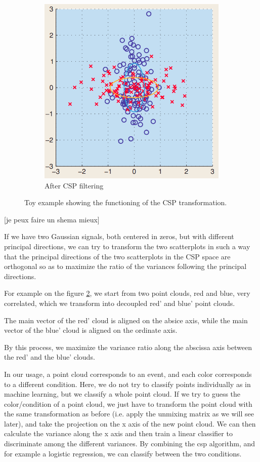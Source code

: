 \begin{figure}
\begin{subfigure}{.5\textwidth}
        \includegraphics[width=1.\linewidth]{images_report/sensor/after_csp_filtering.png}
        \caption{After CSP filtering}
        \label{fig:after_csp}
    \end{subfigure}
    \caption{Toy example showing the functioning of the CSP transformation.}
    \label{fig:csp_intuitive}
\end{figure}
[je peux faire un shema mieux]

If we have two Gaussian signals, both centered in zeros, but with different principal directions, we can try to transform the two scatterplots in such a way that the principal directions of the two scatterplots in the CSP space are orthogonal so as to maximize the ratio of the variances following the principal directions.

For example on the figure \ref{fig:csp_intuitive}, we start from two point clouds, red and blue, very correlated, which we transform into decoupled red' and blue' point clouds.

The main vector of the red' cloud is aligned on the absice axis, while the main vector of the blue' cloud is aligned on the ordinate axis.

By this process, we maximize the variance ratio along the abscissa axis between the red' and the blue' clouds.

In our usage, a point cloud corresponds to an event, and each color corresponds to a different condition. Here, we do not try to classify points individually as in machine learning, but we classify a whole point cloud. If we try to guess the color/condition of a point cloud, we just have to transform the point cloud with the same transformation as before (i.e. apply the unmixing matrix as we will see later), and take the projection on the x axis of the new point cloud. We can then calculate the variance along the x axis and then train a linear classifier to discriminate among the different variances. By combining the csp algorithm, and for example a logistic regression, we can classify between the two conditions.

